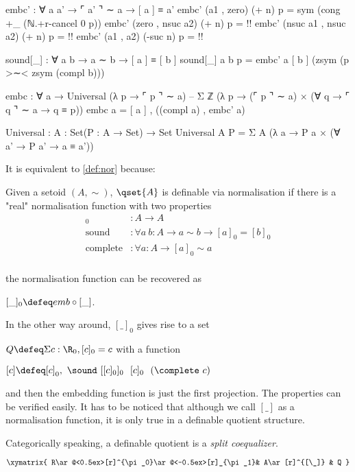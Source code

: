 embc' : ∀ a a' → ⌜ a' ⌝ ∼ a → [ a ] ≡ a'
embc' (a1 , zero) (+ n) p = sym (cong +_ (ℕ.+r-cancel 0 p))
embc' (zero , nsuc a2) (+ n) p = {!!}
embc' (nsuc a1 , nsuc a2) (+ n) p = {!!}
embc' (a1 , a2) (-suc n) p = {!!}

sound[_] : ∀ a b → a ∼ b → [ a ] ≡ [ b ]
sound[_] a b p = embc' a [ b ] (zsym (p >∼< zsym (compl b)))

embc : ∀ a → Universal (λ p → ⌜ p ⌝ ∼ a) -- Σ ℤ (λ p → (⌜ p ⌝ ∼ a) × (∀ q →  ⌜ q ⌝ ∼ a → q ≡ p))
embc a  = [ a ] , ((compl a) , embc' a)



Universal : {A : Set}(P : A → Set) → Set
Universal {A} P = Σ A (λ a → P a × (∀ a' →  P a' → a ≡ a'))



It is equivalent to \autoref{def:nor} because:


\begin{definition}\label{def:nor}
Given a setoid $(A,\sim)$, $\qset{A}$ is definable via normalisation if there is a "real" normalisation function with two properties
\begin{align*}
[\_]_0 &: A \to A \\
\text{sound} &: \forall a ~ b : A \to a \sim b \to [ a ]_0 = [ b ]_0\\
\text{complete} &: \forall a : A \to [ a ]_0 \sim a\\
\end{align*}
\end{definition}

the normalisation function can be recovered as 

$[\_]_0 \defeq emb \circ [\_]$. 

In the other way around, $[\_]_0$ gives rise to a set 

$Q \defeq \Sigma c : \R_0, [ c ]_0 = c$ with a function 

$[ c ] \defeq [c]_0 , ~\sound ~ [[c]_0]_0 ~~ [c]_0~~ (\complete ~ c)$

 and then the embedding function is just the first projection. The properties can be verified easily. It has to be noticed that although we call $[\_]$ as a normalisation function, it is only true in a definable quotient structure.

Categorically speaking, a definable quotient is a \emph{split coequalizer}.

\[\xymatrix{
R\ar@<0.5ex>[r]^{\pi_0}\ar@<-0.5ex>[r]_{\pi_1}& A\ar[r]^{[\_]}
& Q
}\]







